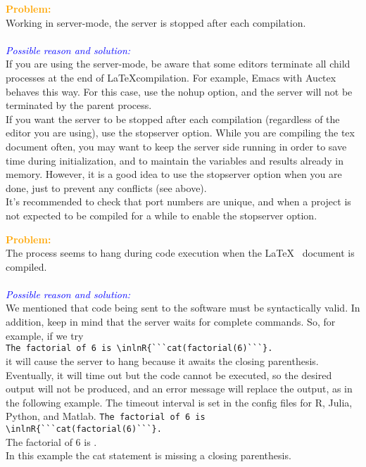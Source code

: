 \documentclass[a4paper,10pt]{article}
\newcommand{\prob}[1] {\bigskip\noindent\textbf{\textcolor{orange}{Problem:}}\\#1\\\\}
\newcommand{\cause}[1] {\noindent\textit{\textcolor{blue}{Possible reason and solution:}}\\#1}
\begin{document}


\prob{Working in server-mode, the server is stopped after each compilation.}
\cause\bgroup
If you are using the server-mode, be aware that some editors terminate all child processes at the end of \LaTeX compilation. For example, Emacs with Auctex behaves this way. For this case, use the nohup option, and the server will not be terminated by the parent process.\\
If you want the server to be stopped after each compilation (regardless of the editor you are using), use the stopserver option. While you are compiling the tex document often, you may want to keep the server side running in order to save time during initialization, and to maintain the variables and results already in memory. However, it is a good idea to use the stopserver option when you are done, just to prevent any conflicts (see above).\\
It's recommended to check that port numbers are unique, and when a project is not expected to be compiled for a while to enable the stopserver option. 
\egroup






\prob{The process seems to hang during code execution when the \LaTeX~ document is compiled.}
\cause\bgroup
We mentioned that code being sent to the software must be syntactically valid. In addition, keep in mind that the server waits for complete commands. So, for example, if we try\\
\verb|The factorial of 6 is \inlnR{```cat(factorial(6)```}.|\\
it will cause the server to hang because it awaits the closing parenthesis. Eventually, it will time out but the code cannot be executed, so the desired output will not be produced, and an error message will replace the output, as in the following example. The timeout interval is set in the config files for R, Julia, Python, and Matlab.
\verb|The factorial of 6 is \inlnR{```cat(factorial(6)```}.|\\
The factorial of 6 is .\\
In this example the cat statement is missing a closing parenthesis.\\
\egroup
\end{document}
